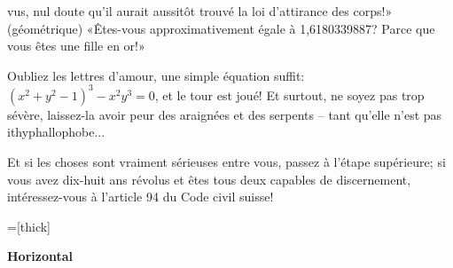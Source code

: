 \begin{article}
\begin{spacing}{.9}
vus, nul doute qu'il aurait aussitôt trouvé la loi d'attirance des corps!»
(géométrique) «Êtes-vous approximativement égale à 1,6180339887? Parce que vous êtes une fille en or!»

Oubliez les lettres d'amour, une simple équation suffit: $(x^2 + y^2 - 1)^3 - x^2y^3 = 0$, et le tour est joué! Et surtout, ne soyez pas trop sévère, laissez-la avoir peur des araignées et des serpents -- tant qu'elle n'est pas ithyphallophobe...

Et si les choses sont vraiment sérieuses entre vous, passez à l'étape supérieure; si vous avez dix-huit ans révolus et êtes tous deux capables de discernement, intéressez-vous à l'article 94 du Code civil suisse!
\end{spacing}
\end{article}




\newpage



\vspace*{-1.8cm}
\vspace*{-5mm}\begin{minipage}{.48\textwidth}
=[thick]
\end{minipage}\hspace*{5mm}\begin{minipage}{.48\textwidth}
\textbf{Horizontal}
\vspace*{-2mm}\begin{multicols*}{2}
\\
\\
\\
\\
\\
\\

\columnbreak

\\
\\
\\
\\
\end{multicols*}
\end{minipage}

